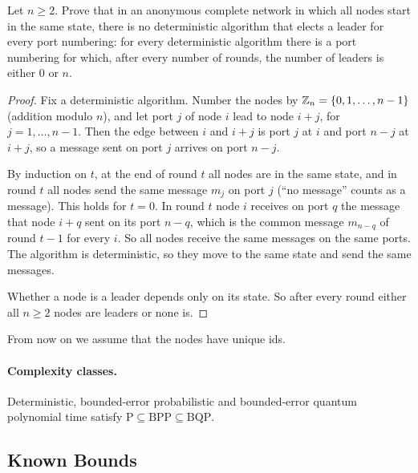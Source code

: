 \begin{exercisebox}
\begin{exercise}\label{ex:anonymous-0908}\label{thm:anonymous-0908}
    Let $n \geq 2$. Prove that in an anonymous complete network in which all nodes start in the same
    state, there is no deterministic algorithm that elects a leader for every port numbering: for
    every deterministic algorithm there is a port numbering for which, after every number of rounds,
    the number of leaders is either $0$ or $n$.
\end{exercise}
\tcblower
\begin{proof}
    Fix a deterministic algorithm. Number the nodes by $\mathbb{Z}_n = \left\lbrace0, 1, \dots, n-1\right\rbrace$
    (addition modulo $n$), and let port $j$ of node $i$ lead to node $i + j$, for $j = 1, \dots, n-1$.
    Then the edge between $i$ and $i + j$ is port $j$ at $i$ and port $n - j$ at $i + j$, so a
    message sent on port $j$ arrives on port $n - j$.

    By induction on $t$, at the end of round $t$ all nodes are in the same state, and in round $t$
    all nodes send the same message $m_j$ on port $j$ (``no message'' counts as a message). This
    holds for $t = 0$. In round $t$ node $i$ receives on port $q$ the message that node $i + q$ sent
    on its port $n - q$, which is the common message $m_{n-q}$ of round $t - 1$ for every $i$. So
    all nodes receive the same messages on the same ports. The algorithm is deterministic, so they
    move to the same state and send the same messages.

    Whether a node is a leader depends only on its state. So after every round either all
    $n \geq 2$ nodes are leaders or none is.
\end{proof}
\end{exercisebox}

From now on we assume that the nodes have unique ids.

\paragraph{Complexity classes.} Deterministic, bounded-error probabilistic and bounded-error quantum
polynomial time satisfy $\mathrm{P} \subseteq \mathrm{BPP} \subseteq \mathrm{BQP}$.

\subsection{Known Bounds}

